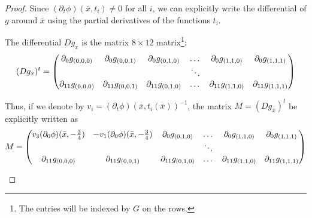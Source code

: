 \documentclass[9pt]{article}
\begin{document}
\begin{proof}
  Since $(\partial_t \phi)(\bar x, t_i) \neq 0$ for all $i$, we can explicitly write the differential of $g$ around $\bar x$ using the partial derivatives of the functions $t_i$.
  
  The differential $Dg_x$ is the matrix $8\times 12$ matrix\footnote{The entries will be indexed by $G$ on the rows.}: 
  \[
    (Dg_x)^t = \begin{pmatrix}
      \partial_0 g_{(0,0,0)} & \partial_0 g_{(0,0,1)} & \partial_0 g_{(0,1,0)} & \dots & \partial_0 g_{(1,1,0)} &\partial_0 g_{(1,1,1)} \\
      & & & \ddots&&\\
      
      \partial_{11} g_{(0,0,0)} & \partial_{11} g_{(0,0,1)} & \partial_{11} g_{(0,1,0)} & \dots &  \partial_{11} g_{(1,1,0)} & \partial_{11} g_{(1,1,1)} \\
      \end{pmatrix}
    \]

    Thus, if we denote by $v_i = (\partial_t \phi)(\bar x, t_i(\bar x))^{-1}$, the matrix $M = (Dg_{\bar x})^t$ be explicitly written as 
    \[
    M = \begin{pmatrix}
      v_{3}(\partial_0 \phi)(\bar x, -\frac{3}{4}) & -v_1(\partial_0 \phi)(\bar x, -\frac{3}{4}) & \partial_0 g_{(0,1,0)} & \dots & \partial_0 g_{(1,1,0)} &\partial_0 g_{(1,1,1)} \\
      & & & \ddots&&\\
      
      \partial_{11} g_{(0,0,0)} & \partial_{11} g_{(0,0,1)} & \partial_{11} g_{(0,1,0)} & \dots &  \partial_{11} g_{(1,1,0)} & \partial_{11} g_{(1,1,1)} \\
      \end{pmatrix}
    \]

    \cite{guth_polynomial_2015}    
\end{proof}
\printbibliography
\end{document}
